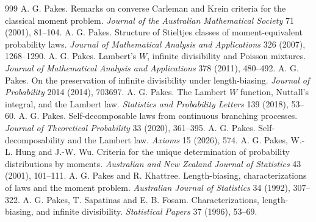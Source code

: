\begin{thebibliography}{999}
 A. G. Pakes. Remarks on converse Carleman and Krein criteria for the classical moment problem. \emph{Journal of the Australian Mathematical Society} 71 (2001), 81--104.
 A. G. Pakes. Structure of Stieltjes classes of moment-equivalent probability laws. \emph{Journal of Mathematical Analysis and Applications} 326 (2007), 1268--1290.
 A. G. Pakes. Lambert's $W$, infinite divisibility and Poisson mixtures. \emph{Journal of Mathematical Analysis and Applications} 378 (2011), 480--492.
 A. G. Pakes. On the preservation of infinite divisibility under length-biasing. \emph{Journal of Probability} 2014 (2014), 703697.
 A. G. Pakes. The Lambert $W$ function, Nuttall's integral, and the Lambert law. \emph{Statistics and Probability Letters} 139 (2018), 53--60.
 A. G. Pakes. Self-decomposable laws from continuous branching processes. \emph{Journal of Theoretical Probability} 33 (2020), 361--395.
 A. G. Pakes. Self-decomposability and the Lambert law. \emph{Axioms} 15 (2026), 574.
 A. G. Pakes, W.-L. Hung and J.-W. Wu. Criteria for the unique determination of probability distributions by moments. \emph{Australian and New Zealand Journal of Statistics} 43 (2001), 101--111.
 A. G. Pakes and R. Khattree. Length-biasing, characterizations of laws and the moment problem. \emph{Australian Journal of Statistics} 34 (1992), 307--322.
 A. G. Pakes, T. Sapatinas and E. B. Fosam. Characterizations, length-biasing, and infinite divisibility. \emph{Statistical Papers} 37 (1996), 53--69.

\end{thebibliography}
